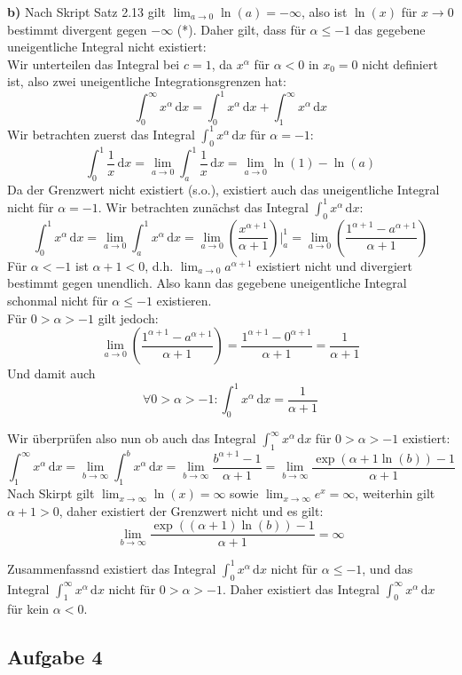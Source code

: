 \documentclass[a4paper,graphics,11pt]{article}
\newcommand{\aufgabe}[1]{\subsection*{Aufgabe #1}}
\begin{document}
\textbf{b)}
Nach Skript Satz 2.13 gilt $\lim_{a \to 0} \ln(a) = -\infty$, also ist $\ln(x)$ für $x\to 0$ bestimmt divergent
gegen $-\infty$ (*). Daher gilt, dass für $\alpha \leq -1$ das gegebene uneigentliche Integral nicht existiert:\\
Wir unterteilen das Integral bei $c=1$, da $x^\alpha$ für $\alpha <0$ in $x_0=0$ nicht definiert ist, also zwei
uneigentliche Integrationsgrenzen hat:
$$
	\int_{0}^{\infty} x^\alpha\, \mathrm{d}x
	= \int_{0}^{1} x^\alpha\, \mathrm{d}x + \int_{1}^{\infty} x^\alpha\, \mathrm{d}x
$$
Wir betrachten zuerst das Integral $\int_{0}^{1} x^\alpha\, \mathrm{d}x$ für $\alpha = -1$:
$$
	\int_{0}^{1} \frac{1}{x}\, \mathrm{d}x
	= \lim_{a \to 0} \int_{a}^{1} \frac{1}{x}\, \mathrm{d}x
	= \lim_{a \to 0} \ln(1)-\ln(a)
$$
Da der Grenzwert nicht existiert (s.o.), existiert auch das uneigentliche Integral nicht für $\alpha = -1$.
Wir betrachten zunächst das Integral $\int_{0}^{1} x^\alpha\, \mathrm{d}x$:
$$
	\int_{0}^{1} x^\alpha\, \mathrm{d}x
	= \lim_{a \to 0} \int_{a}^{1} x^\alpha\, \mathrm{d}x
	= \lim_{a \to 0} \left(\frac{x^{\alpha+1}}{\alpha+1}\right)\bigg|_a^1
	= \lim_{a \to 0} \left(\frac{1^{\alpha+1}-a^{\alpha+1}}{\alpha+1}\right)
$$
Für $\alpha < -1$ ist $\alpha+1 < 0$, d.h. $\lim_{a \to 0}\limits a^{\alpha+1}$ existiert nicht und
divergiert bestimmt gegen unendlich. Also kann das gegebene uneigentliche Integral schonmal
nicht für $\alpha \leq -1$ existieren.\\
Für $0 > \alpha > -1$ gilt jedoch:
$$
	\lim_{a \to 0} \left(\frac{1^{\alpha+1}-a^{\alpha+1}}{\alpha+1}\right)
	= \frac{1^{\alpha+1}-0^{\alpha+1}}{\alpha+1}
	= \frac{1}{\alpha+1}
$$
Und damit auch
$$
	\forall 0 > \alpha > -1\colon \int_{0}^{1} x^\alpha\, \mathrm{d}x = \frac{1}{\alpha+1}
$$
\newpage

Wir überprüfen also nun ob auch das Integral $\int_{1}^{\infty} x^\alpha\, \mathrm{d}x$ für
$0 > \alpha > -1$ existiert:
$$
	\int_{1}^{\infty} x^\alpha\, \mathrm{d}x
	= \lim_{b \to \infty} \int_{1}^{b} x^\alpha\, \mathrm{d}x
	= \lim_{b \to \infty} \frac{b^{\alpha+1}-1}{\alpha+1}
	= \lim_{b \to \infty} \frac{\exp(\alpha+1\ln(b))-1}{\alpha+1}
$$
Nach Skirpt gilt $\lim_{x \to \infty}\limits \ln(x) = \infty$ sowie
$\lim_{x \to \infty}\limits e^x = \infty$, weiterhin gilt $\alpha+1 > 0$, daher existiert der
Grenzwert nicht und es gilt:
$$
	\lim_{b \to \infty} \frac{\exp((\alpha+1)\ln(b))-1}{\alpha+1} = \infty
$$

Zusammenfassnd existiert das Integral $\int_{0}^{1} x^\alpha\, \mathrm{d}x$ nicht für
$\alpha \leq -1$, und das Integral $\int_{1}^{\infty} x^\alpha\, \mathrm{d}x$ nicht für
$0 > \alpha >-1$. Daher existiert das Integral $\int_{0}^{\infty} x^\alpha\, \mathrm{d}x$ für
kein $\alpha < 0$.


\aufgabe{4}
\end{document}
